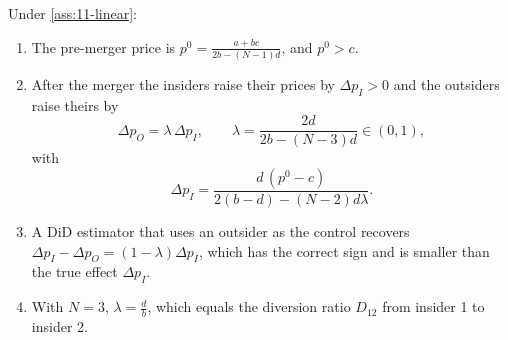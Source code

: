 \begin{proposition}\label{prop:11-didbias}
Under \cref{ass:11-linear}:
\begin{enumerate}[label=(\roman*)]
\item The pre-merger price is $p^0=\frac{a+bc}{2b-(N-1)d}$, and $p^0>c$.
\item After the merger the insiders raise their prices by $\Delta p_I>0$ and the outsiders raise theirs by
\begin{equation}\label{eq:11-lambda}
\Delta p_O=\lambda\,\Delta p_I,\qquad \lambda=\frac{2d}{2b-(N-3)d}\in(0,1),
\end{equation}
with
\begin{equation}\label{eq:11-dpI}
\Delta p_I=\frac{d\,(p^0-c)}{2(b-d)-(N-2)d\lambda}.
\end{equation}
\item A DiD estimator that uses an outsider as the control recovers $\Delta p_I-\Delta p_O=(1-\lambda)\Delta p_I$,
which has the correct sign and is smaller than the true effect $\Delta p_I$.
\item With $N=3$, $\lambda=\frac{d}{b}$, which equals the diversion ratio $D_{12}$ from insider 1 to insider 2.
\end{enumerate}
\end{proposition}

